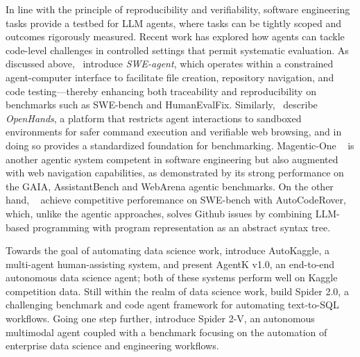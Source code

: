 \documentclass[]{fairmeta}
\begin{document}




In line with the principle of reproducibility and verifiability, software engineering tasks provide a testbed for LLM agents, where tasks can be tightly scoped and outcomes rigorously measured. Recent work has explored how agents can tackle code-level challenges in controlled settings that permit systematic evaluation. As discussed above,~\citet{yangSWEagentAgentComputerInterfaces2024} introduce \textit{SWE-agent}, which operates within a constrained agent-computer interface to facilitate file creation, repository navigation, and code testing—thereby enhancing both traceability and reproducibility on benchmarks such as SWE-bench and HumanEvalFix. Similarly,~\citet{wangOpenDevinOpenPlatform2024} describe \textit{OpenHands}, a platform that restricts agent interactions to sandboxed environments for safer command execution and verifiable web browsing, and in doing so provides a standardized foundation for benchmarking. Magentic-One ~\citep{fourney2024magenticonegeneralistmultiagentsolving} is another agentic system competent in software engineering but also augmented with web navigation capabilities, as demonstrated by its strong performance on the GAIA, AssistantBench and WebArena \citep{zhou2023webarena} agentic benchmarks.  On the other hand, ~\citet{zhang2024autocoderover} achieve competitive perforemance on SWE-bench with AutoCodeRover, which, unlike the agentic approaches, solves  Github issues by combining LLM-based programming with program representation as an abstract syntax tree.



Towards the goal of automating data science work, \citet{li2024autokagglemultiagentframeworkautonomous} introduce AutoKaggle, a multi-agent human-assisting system, and \citet{grosnit2024largelanguagemodelsorchestrating} present AgentK v1.0, an end-to-end autonomous data science agent; both of these systems perform well on Kaggle competition data. Still within the realm of data science work, \citet{lei2024spider20evaluatinglanguage} build Spider 2.0, a challenging benchmark and code agent framework for automating text-to-SQL workflows. Going one step further,  \citet{cao2024spider2vfarmultimodalagents} introduce Spider 2-V,  an autonomous multimodal agent   coupled with a benchmark focusing on the automation of enterprise data science and engineering workflows.
\end{document}
